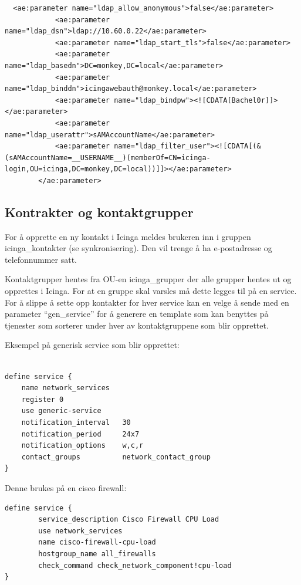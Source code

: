 \begin{lstlisting}
  <ae:parameter name="ldap_allow_anonymous">false</ae:parameter>
            <ae:parameter name="ldap_dsn">ldap://10.60.0.22</ae:parameter>
            <ae:parameter name="ldap_start_tls">false</ae:parameter>
            <ae:parameter name="ldap_basedn">DC=monkey,DC=local</ae:parameter>
            <ae:parameter name="ldap_binddn">icingawebauth@monkey.local</ae:parameter>
            <ae:parameter name="ldap_bindpw"><![CDATA[Bachel0r]]></ae:parameter>
            <ae:parameter name="ldap_userattr">sAMAccountName</ae:parameter>
            <ae:parameter name="ldap_filter_user"><![CDATA[(&(sAMAccountName=__USERNAME__)(memberOf=CN=icinga-login,OU=icinga,DC=monkey,DC=local))]]></ae:parameter>
        </ae:parameter>
\end{lstlisting}

\subsection{Kontrakter og kontaktgrupper}

For å opprette en ny kontakt i Icinga meldes brukeren inn i gruppen icinga\_kontakter (se synkronisering). Den vil trenge å ha e-postadresse og telefonnummer satt.

Kontaktgrupper hentes fra OU-en icinga\_grupper der alle grupper hentes ut og opprettes i Icinga. For at en gruppe skal varsles må dette legges til på en service. For å slippe å sette opp kontakter for hver service kan en velge å sende med en parameter “gen\_service” for å generere en template som kan benyttes på tjenester som sorterer under hver av kontaktgruppene som blir opprettet.

Eksempel på generisk service som blir opprettet:

\begin{lstlisting}[float=h]

define service {
    name network_services
    register 0
    use generic-service     
    notification_interval   30
    notification_period     24x7
    notification_options    w,c,r
    contact_groups          network_contact_group
}

\end{lstlisting}

Denne brukes på en cisco firewall: 

\begin{lstlisting}
define service {
        service_description Cisco Firewall CPU Load
        use network_services
        name cisco-firewall-cpu-load
        hostgroup_name all_firewalls
        check_command check_network_component!cpu-load
}


\end{lstlisting}
